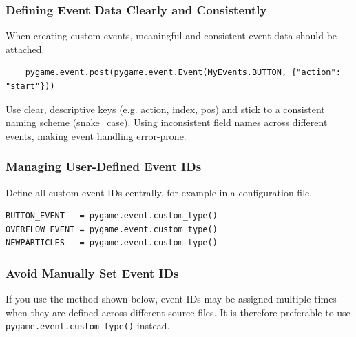 \subsubsection{Defining Event Data Clearly and Consistently}

When creating custom events, meaningful and consistent event data should be attached.

\lstset{firstnumber=1}
\begin{lstlisting}
	pygame.event.post(pygame.event.Event(MyEvents.BUTTON, {"action": "start"}))
\end{lstlisting}

Use clear, descriptive keys (e.g. action, index, pos) and stick to a consistent naming scheme (snake\_case). Using inconsistent field names across different events, making event handling error-prone.

\newpage
\subsubsection{Managing User-Defined Event IDs}

\begin{hintbox}
	Define all custom event IDs centrally, for example in a configuration file.
\end{hintbox}

\lstset{firstnumber=1}
\begin{lstlisting}
BUTTON_EVENT   = pygame.event.custom_type()
OVERFLOW_EVENT = pygame.event.custom_type()
NEWPARTICLES   = pygame.event.custom_type()
\end{lstlisting}


\subsubsection{Avoid Manually Set Event IDs}

\begin{warningbox}
	If you use the method shown below, event IDs may be assigned multiple times when they are defined across different source files. It is therefore preferable to use \texttt{pygame.event.custom\_type()} instead.

\end{warningbox}


